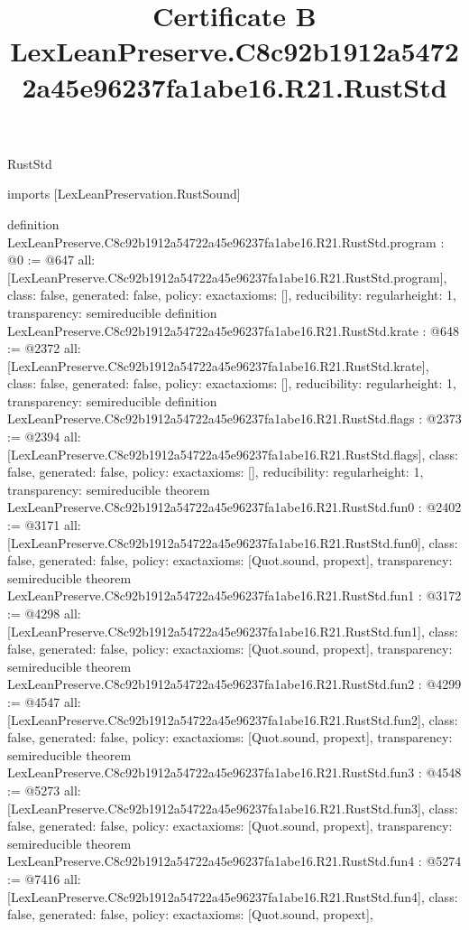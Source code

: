 \begin{lexlean}{RustStd}
\title{Certificate B LexLeanPreserve.C8c92b1912a54722a45e96237fa1abe16.R21.RustStd}
\begin{coremodule}
imports [LexLeanPreservation.RustSound]

definition LexLeanPreserve.C8c92b1912a54722a45e96237fa1abe16.R21.RustStd.program : @0 := @647 {
  all: [LexLeanPreserve.C8c92b1912a54722a45e96237fa1abe16.R21.RustStd.program],
  class: false,
  generated: false,
  policy: exact{axioms: []},
  reducibility: regular{height: 1},
  transparency: semireducible
}
definition LexLeanPreserve.C8c92b1912a54722a45e96237fa1abe16.R21.RustStd.krate : @648 := @2372 {
  all: [LexLeanPreserve.C8c92b1912a54722a45e96237fa1abe16.R21.RustStd.krate],
  class: false,
  generated: false,
  policy: exact{axioms: []},
  reducibility: regular{height: 1},
  transparency: semireducible
}
definition LexLeanPreserve.C8c92b1912a54722a45e96237fa1abe16.R21.RustStd.flags : @2373 := @2394 {
  all: [LexLeanPreserve.C8c92b1912a54722a45e96237fa1abe16.R21.RustStd.flags],
  class: false,
  generated: false,
  policy: exact{axioms: []},
  reducibility: regular{height: 1},
  transparency: semireducible
}
theorem LexLeanPreserve.C8c92b1912a54722a45e96237fa1abe16.R21.RustStd.fun0 : @2402 := @3171 {
  all: [LexLeanPreserve.C8c92b1912a54722a45e96237fa1abe16.R21.RustStd.fun0],
  class: false,
  generated: false,
  policy: exact{axioms: [Quot.sound, propext]},
  transparency: semireducible
}
theorem LexLeanPreserve.C8c92b1912a54722a45e96237fa1abe16.R21.RustStd.fun1 : @3172 := @4298 {
  all: [LexLeanPreserve.C8c92b1912a54722a45e96237fa1abe16.R21.RustStd.fun1],
  class: false,
  generated: false,
  policy: exact{axioms: [Quot.sound, propext]},
  transparency: semireducible
}
theorem LexLeanPreserve.C8c92b1912a54722a45e96237fa1abe16.R21.RustStd.fun2 : @4299 := @4547 {
  all: [LexLeanPreserve.C8c92b1912a54722a45e96237fa1abe16.R21.RustStd.fun2],
  class: false,
  generated: false,
  policy: exact{axioms: [Quot.sound, propext]},
  transparency: semireducible
}
theorem LexLeanPreserve.C8c92b1912a54722a45e96237fa1abe16.R21.RustStd.fun3 : @4548 := @5273 {
  all: [LexLeanPreserve.C8c92b1912a54722a45e96237fa1abe16.R21.RustStd.fun3],
  class: false,
  generated: false,
  policy: exact{axioms: [Quot.sound, propext]},
  transparency: semireducible
}
theorem LexLeanPreserve.C8c92b1912a54722a45e96237fa1abe16.R21.RustStd.fun4 : @5274 := @7416 {
  all: [LexLeanPreserve.C8c92b1912a54722a45e96237fa1abe16.R21.RustStd.fun4],
  class: false,
  generated: false,
  policy: exact{axioms: [Quot.sound, propext]},
}
\end{coremodule}
\end{lexlean}
